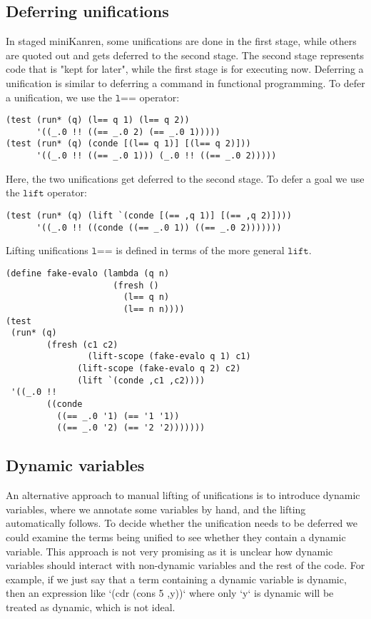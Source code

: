 \documentclass[11pt]{article}
\theoremstyle{definition}
\newcommand\tab[1][1cm]{\hspace*{#1}}
\begin{document}
\subsection{Deferring unifications}
\tab In staged miniKanren, some unifications are done in the first stage, while others are quoted out and gets deferred to the second stage. The second stage represents code that is "kept for later", while the first stage is for executing now. Deferring a unification is similar to deferring a command in functional programming. \newline 
\tab To defer a unification, we use the $\texttt{l==}$ operator:
\begin{lstlisting}[]
(test (run* (q) (l== q 1) (l== q 2))
      '((_.0 !! ((== _.0 2) (== _.0 1)))))
(test (run* (q) (conde [(l== q 1)] [(l== q 2)]))
      '((_.0 !! ((== _.0 1))) (_.0 !! ((== _.0 2)))))
\end{lstlisting}
\tab Here, the two unifications get deferred to the second stage. To defer a goal we use the $\texttt{lift}$ operator:
\begin{lstlisting}[]
(test (run* (q) (lift `(conde [(== ,q 1)] [(== ,q 2)])))
      '((_.0 !! ((conde ((== _.0 1)) ((== _.0 2)))))))
\end{lstlisting}
\tab Lifting unifications $\texttt{l==}$ is defined in terms of the more general $\texttt{lift}$.
\begin{lstlisting}[]
(define fake-evalo (lambda (q n)
                     (fresh ()
                       (l== q n)
                       (l== n n))))
(test
 (run* (q)
        (fresh (c1 c2)
                (lift-scope (fake-evalo q 1) c1)
              (lift-scope (fake-evalo q 2) c2)
              (lift `(conde ,c1 ,c2))))
 '((_.0 !!
        ((conde
          ((== _.0 '1) (== '1 '1))
          ((== _.0 '2) (== '2 '2)))))))
\end{lstlisting}
\subsection{Dynamic variables}
\tab An alternative approach to manual lifting of unifications is to introduce dynamic variables, where we annotate some variables by hand, and the lifting automatically follows. To decide whether the unification needs to be deferred we could examine the terms being unified to see whether they contain a dynamic variable. This approach is not very promising as it is unclear how dynamic variables should interact with non-dynamic variables and the rest of the code. For example, if we just say that a term containing a dynamic variable is dynamic, then an expression like `(cdr (cons 5 ,y))` where only `y` is dynamic will be treated as dynamic, which is not ideal.
\end{document}
